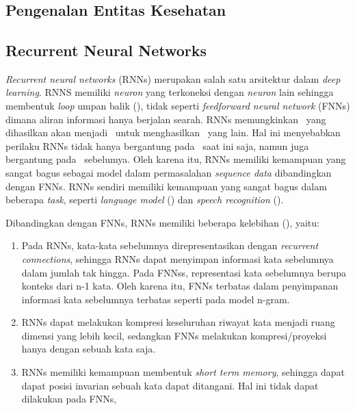 \chapter{\babDua}

\section{Pengenalan Entitas Kesehatan}

\section{Recurrent Neural Networks}
\textit{Recurrent neural networks} (RNNs) merupakan salah satu arsitektur dalam \textit{deep learning}. RNNS memiliki \textit{neuron} yang terkoneksi dengan \textit{neuron} lain sehingga membentuk \textit{loop} umpan balik (\cite{haykin2009neural}), tidak seperti \textit{feedforward neural network} (FNNs) dimana aliran informasi hanya berjalan searah. RNNs memungkinkan \iob~yang dihasilkan akan menjadi \ioa~untuk menghasilkan \iob~yang lain. Hal ini menyebabkan perilaku RNNs tidak hanya bergantung pada \ioa~saat ini saja, namun juga bergantung pada \iob~sebelumya. Oleh karena itu, RNNs memiliki kemampuan yang sangat bagus sebagai model dalam permasalahan \textit{sequence data} dibandingkan dengan FNNs. RNNs sendiri memiliki kemampuan yang sangat bagus dalam beberapa \textit{task}, seperti \textit{language model} (\cite{mikolov2010recurrent}) dan \textit{speech recognition} (\cite{graves2013speech}).

Dibandingkan dengan FNNs, RNNs memiliki beberapa kelebihan (\cite{mikolov2010recurrent}), yaitu:
\begin{enumerate}
	\item Pada RNNs, kata-kata sebelumnya direpresentasikan dengan \textit{recurrent connections}, sehingga RNNs dapat menyimpan informasi kata sebelumnya dalam jumlah tak hingga. Pada FNNss, representasi kata sebelumnya berupa konteks dari n-1 kata. Oleh karena itu, FNNs terbatas dalam penyimpanan informasi kata sebelumnya terbatas seperti pada model n-gram.
	\item RNNs dapat melakukan kompresi keseluruhan riwayat kata menjadi ruang dimensi yang lebih kecil, sedangkan FNNs melakukan kompresi/proyeksi hanya dengan sebuah kata saja.
	\item RNNs memiliki kemampuan membentuk \textit{short term memory}, sehingga dapat dapat posisi invarian sebuah kata dapat ditangani. Hal ini tidak dapat dilakukan pada FNNs,
\end{enumerate}

